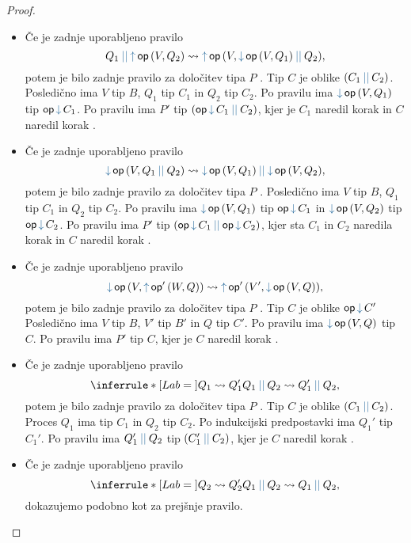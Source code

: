 \begin{proof}
\begin{itemize}
		\item Če je zadnje uporabljeno pravilo
		$$\tmpar{Q_1}{\tmopout{op}{V}{Q_2}} \reduces \tmopout{op}{V}{\tmpar{\tmopin{op}{V}{Q_1}}{Q_2}},$$
		potem je bilo zadnje pravilo za določitev tipa $P$ . Tip $C$ je oblike $\typar{C_1}{C_2}$.
		Posledično ima $V$ tip $B$, $Q_1$ tip $C_1$ in $Q_2$ tip $C_2$.
		Po pravilu  ima $\tmopin{op}{V}{Q_1}$ tip $\opincomp{op}{C_1}$.
		Po pravilu  ima $P'$ tip $\typar{\opincomp{op}{C_1}}{C_2}$, kjer je $C_1$ naredil korak  in $C$ naredil korak .
	
		\item Če je zadnje uporabljeno pravilo
		$$\tmopin{op}{V}{\tmpar{Q_1}{Q_2}} \reduces \tmpar {\tmopin{op}{V}{Q_1}} {\tmopin{op}{V}{Q_2}},$$
		potem je bilo zadnje pravilo za določitev tipa $P$ .
		Posledično ima $V$ tip $B$, $Q_1$ tip $C_1$ in $Q_2$ tip $C_2$.
		Po pravilu  ima $\tmopin{op}{V}{Q_1}$ tip $\opincomp{op}{C_1}$ in $\tmopin{op}{V}{Q_2}$ tip $\opincomp{op}{C_2}$.
		Po pravilu  ima $P'$ tip $\typar{\opincomp{op}{C_1}}{\opincomp{op}{C_2}}$, kjer sta $C_1$ in $C_2$ naredila korak  in $C$ naredil korak .
		
		\item Če je zadnje uporabljeno pravilo
		$$\tmopin{op}{V}{\tmopout{op'}{W}{Q}} \reduces \tmopout{op'}{V'}{\tmopin{op}{V}{Q}},$$
		potem je bilo zadnje pravilo za določitev tipa $P$ . Tip $C$ je oblike $\opincomp{op}{C'}$
		Posledično ima $V$ tip $B$, $V'$ tip $B'$ in $Q$ tip $C'$.
		Po pravilu  ima $\tmopin{op}{V}{Q}$ tip $C$.
		Po pravilu  ima $P'$ tip $C$, kjer je $C$ naredil korak .
		
		\item Če je zadnje uporabljeno pravilo
		$$
		\coopinfer{}{
			Q_1 \reduces Q_1'
		}{
			\tmpar{Q_1}{Q_2}  \reduces \tmpar{Q_1'}{Q_2}
		},$$
		potem je bilo zadnje pravilo za določitev tipa $P$ . Tip $C$ je oblike $\typar{C_1}{C_2}$.
		Proces $Q_1$ ima tip $C_1$ in $Q_2$ tip $C_2$.
		Po indukcijski predpostavki ima $Q_1'$ tip $C_1'$.
		Po pravilu  ima $\tmpar{Q_1'}{Q_2}$ tip $\typar{C_1'}{C_2}$, kjer je $C$ naredil korak .

		\item Če je zadnje uporabljeno pravilo
		$$
		\coopinfer{}{
			Q_2 \reduces Q_2'
		}{
			\tmpar{Q_1}{Q_2}  \reduces \tmpar{Q_1}{Q_2}
		},$$
		dokazujemo podobno kot za prejšnje pravilo.
		

\end{itemize}
\end{proof}
